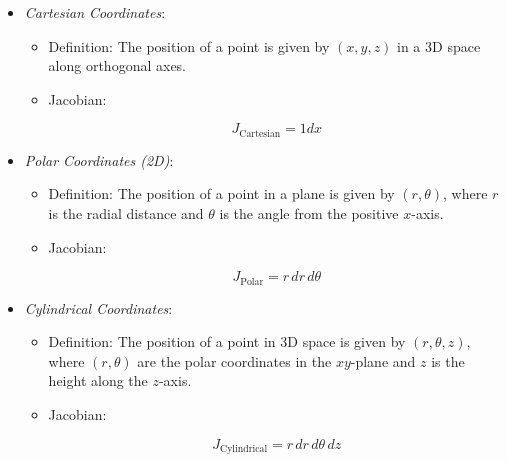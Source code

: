\begin{itemize}

    \item \emph{Cartesian Coordinates}:

    \begin{itemize}
        
        \item Definition: The position of a point is given by \((x, y, z)\) in a 3D space along 
              orthogonal axes.
        
        \item Jacobian: 
        
            \[
                J_{\text{Cartesian}} = 1dx
            \]
    
    \end{itemize}

    \item \emph{Polar Coordinates (2D)}:

    \begin{itemize}

        \item Definition: The position of a point in a plane is given by \((r, \theta)\), where \(r\) 
              is the radial distance and \(\theta\) is the angle from the positive \(x\)-axis.
        
        \item Jacobian:
        
        \[
            J_{\text{Polar}} = r\, dr\, d\theta
        \]

    \end{itemize}

    \item \emph{Cylindrical Coordinates}:

    \begin{itemize}
        
        \item Definition: The position of a point in 3D space is given by \((r, \theta, z)\), where 
              \((r, \theta)\) are the polar coordinates in the \(xy\)-plane and \(z\) is the height along 
              the \(z\)-axis.
        
        \item Jacobian:
        
            \[
                J_{\text{Cylindrical}} = r\, dr\, d\theta\, dz
            \]

    \end{itemize}


\end{itemize}
